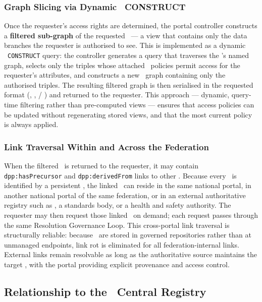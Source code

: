 \subsubsection{Graph Slicing via Dynamic \SPARQL\ CONSTRUCT}

Once the requester's access rights are determined, the portal controller
constructs a \textbf{filtered sub-graph} of the requested \DPP\ --- a view that
contains only the data branches the requester is authorised to see. This is
implemented as a dynamic \SPARQL\ \texttt{CONSTRUCT} query: the controller
generates a query that traverses the \DPP's named graph, selects only the
triples whose attached \ODRL\ policies permit access for the requester's
attributes, and constructs a new \RDF\ graph containing only the authorised
triples. The resulting filtered graph is then serialised in the requested format
(\JSONLD, \TURTLE, \RDF/ \XML) and returned to the requester. This approach ---
dynamic, query-time filtering rather than pre-computed views --- ensures that
access policies can be updated without regenerating stored views, and that the
most current policy is always applied.

\subsubsection{Link Traversal Within and Across the Federation}

When the filtered \DPP\ is returned to the requester, it may contain
\texttt{dpp:hasPrecursor} and \texttt{dpp:derivedFrom} links to other \DPPs.
Because every \DPP\ is identified by a persistent \IRI, the linked \DPP\ can
reside in the same national portal, in another national portal of the same
federation, or in an external authoritative registry such as \ECHA, a standards
body, or a health and safety authority. The requester may then request those
linked \DPPs\ on demand; each request passes through the same Resolution
Governance Loop. This cross-portal link traversal is structurally reliable:
because \DPPs\ are stored in governed repositories rather than at unmanaged
endpoints, link rot is eliminated for all federation-internal links. External
links remain resolvable as long as the authoritative source maintains the
target \IRI, with the portal providing explicit provenance and access control.

\subsection{Relationship to the \EC\ Central Registry}

